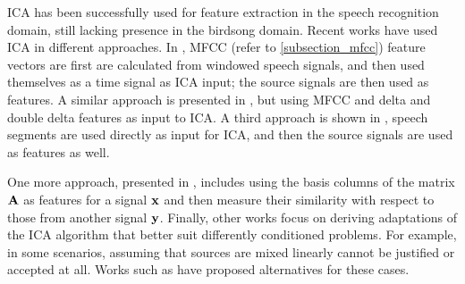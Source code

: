 \documentclass[../main.tex]{subfiles} \label{chapter_soa}
\begin{document}
\par ICA has been successfully used for feature extraction in the speech recognition domain, still lacking presence in the birdsong domain. Recent works have used ICA in different approaches. In \cite{Kasprzak}, MFCC (refer to \ref{subsection_mfcc}) feature vectors are first are calculated from windowed speech signals, and then used themselves as a time signal as ICA input; the source signals are then used as features. A similar approach is presented in \cite{Hsieh2009}, but using MFCC and delta and double delta features as input to ICA. A third approach is shown in \cite{Lee2000}, speech segments are used directly as input for ICA, and then the source signals are used as features as well.
\par One more approach, presented in \cite{Jang2001}, includes using the basis columns of the matrix $\mathbf{A}$ as features for a signal $\mathbf{x}$ and then measure their similarity with respect to those from another signal $\mathbf{y}$. Finally, other works focus on deriving adaptations of the ICA algorithm that better suit differently conditioned problems. For example, in some scenarios, assuming that sources are mixed linearly cannot be justified or accepted at all. Works such as \cite{Almeida2003, Omar} have proposed alternatives for these cases.
\end{document}
